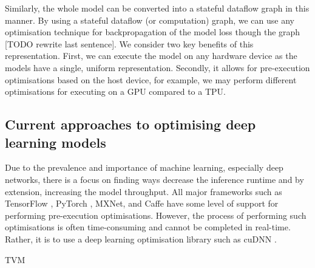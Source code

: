 Similarly, the whole model can be converted into a stateful dataflow graph in this manner. By using a stateful dataflow (or computation) graph, we can use any optimisation technique for backpropagation of the model loss though the graph [TODO rewrite last sentence]. We consider two key benefits of this representation. First, we can execute the model on any hardware device as the models have a single, uniform representation. Secondly, it allows for pre-execution optimisations based on the host device, for example, we may perform different optimisations for executing on a GPU compared to a TPU.

\subsection{Current approaches to optimising deep learning models}

Due to the prevalence and importance of machine learning, especially deep networks, there is a focus on finding ways decrease the inference runtime and by extension, increasing the model throughput. All major frameworks such as TensorFlow \cite{Tensorflow2015-whitepaper}, PyTorch \cite{}, MXNet, and Caffe have some level of support for performing pre-execution optimisations. However, the process of performing such optimisations is often time-consuming and cannot be completed in real-time. Rather, it is to use a deep learning optimisation library such as cuDNN \cite{chetlur2014cudnn}.


TVM

